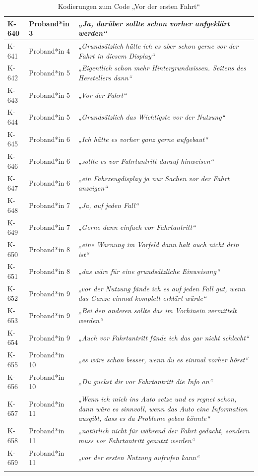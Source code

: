 {\begin{xltabular}{\textwidth}{
    |P{0.10\textwidth}
    |P{0.17\textwidth}
    |Y|
}
K-640 & Proband*in 3 & \textit{„Ja, darüber sollte schon vorher aufgeklärt werden“} \\
\hline
K-641 & Proband*in 4 & \textit{„Grundsätzlich hätte ich es aber schon gerne vor der Fahrt in diesem Display“} \\
\hline
K-642 & Proband*in 5 & \textit{„Eigentlich schon mehr Hintergrundwissen. Seitens des Herstellers dann“} \\
\hline
K-643 & Proband*in 5 & \textit{„Vor der Fahrt“} \\
\hline
K-644 & Proband*in 5 & \textit{„Grundsätzlich das Wichtigste vor der Nutzung“} \\
\hline
K-645 & Proband*in 6 & \textit{„Ich hätte es vorher ganz gerne aufgebaut“} \\
\hline
K-646 & Proband*in 6 & \textit{„sollte es vor Fahrtantritt darauf hinweisen“} \\
\hline
K-647 & Proband*in 6 & \textit{„ein Fahrzeugdisplay ja nur Sachen vor der Fahrt anzeigen“} \\
\hline
K-648 & Proband*in 7 & \textit{„Ja, auf jeden Fall“} \\
\hline
K-649 & Proband*in 7 & \textit{„Gerne dann einfach vor Fahrtantritt“} \\
\hline
K-650 & Proband*in 8 & \textit{„eine Warnung im Vorfeld dann halt auch nicht drin ist“} \\
\hline
K-651 & Proband*in 8 & \textit{„das wäre für eine grundsätzliche Einweisung“} \\
\hline
K-652 & Proband*in 9 & \textit{„vor der Nutzung fände ich es auf jeden Fall gut, wenn das Ganze einmal komplett erklärt würde“} \\
\hline
K-653 & Proband*in 9 & \textit{„Bei den anderen sollte das im Vorhinein vermittelt werden“} \\
\hline
K-654 & Proband*in 9 & \textit{„Auch vor Fahrtantritt fände ich das gar nicht schlecht“} \\
\hline
K-655 & Proband*in 10 & \textit{„es wäre schon besser, wenn du es einmal vorher hörst“} \\
\hline
K-656 & Proband*in 10 & \textit{„Du guckst dir vor Fahrtantritt die Info an“} \\
\hline
K-657 & Proband*in 11 & \textit{„Wenn ich mich ins Auto setze und es regnet schon, dann wäre es sinnvoll, wenn das Auto eine Information ausgibt, dass es da Probleme geben könnte“} \\
\hline
K-658 & Proband*in 11 & \textit{„natürlich nicht für während der Fahrt gedacht, sondern muss vor Fahrtantritt genutzt werden“} \\
\hline
K-659 & Proband*in 11 & \textit{„vor der ersten Nutzung aufrufen kann“} \\
\hline
\caption{Kodierungen zum Code „Vor der ersten Fahrt“}\label{tab:kodiernachweis-vor-der-ersten-fahrt}\\
\end{xltabular}
}

